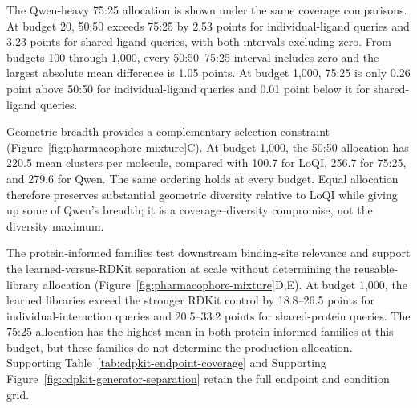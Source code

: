 The Qwen-heavy 75:25 allocation is shown under the same coverage comparisons.
At budget 20, 50:50 exceeds 75:25 by 2.53 points for individual-ligand queries
and 3.23 points for shared-ligand queries, with both intervals excluding zero.
From budgets 100 through 1,000, every 50:50--75:25 interval includes zero and the
largest absolute mean difference is 1.05 points. At budget 1,000, 75:25 is only
0.26 point above 50:50 for individual-ligand queries and 0.01 point below it for
shared-ligand queries.

Geometric breadth provides a complementary selection constraint
(Figure~\ref{fig:pharmacophore-mixture}C). At budget 1,000, the 50:50 allocation
has 220.5 mean clusters per molecule, compared with 100.7 for LoQI, 256.7 for 75:25, and
279.6 for Qwen. The same ordering holds at every budget. Equal allocation therefore
preserves substantial geometric diversity relative to LoQI while giving up some of
Qwen's breadth; it is a coverage--diversity compromise, not the diversity maximum.



The protein-informed families test downstream binding-site relevance and support the
learned-versus-RDKit separation at scale without determining the reusable-library
allocation (Figure~\ref{fig:pharmacophore-mixture}D,E).
At budget 1,000, the learned libraries exceed the stronger RDKit control by
18.8--26.5 points for individual-interaction queries and 20.5--33.2 points for
shared-protein queries. The 75:25 allocation has the highest mean in both
protein-informed families at this budget, but these families do not determine the
production allocation. Supporting Table~\ref{tab:cdpkit-endpoint-coverage}
and Supporting Figure~\ref{fig:cdpkit-generator-separation} retain the full endpoint
and condition grid.

\mixturepolicyfigure
